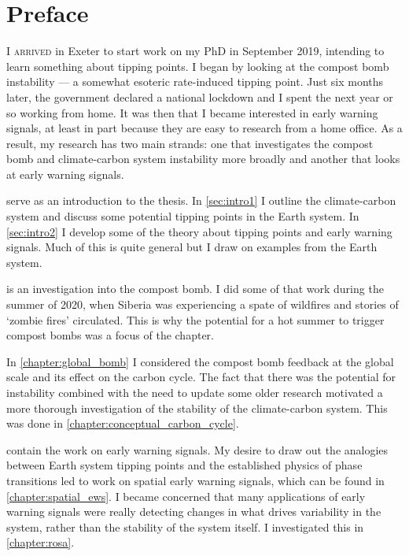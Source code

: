 \chapter{Preface}

\lettrine[lines=3,loversize=0.1,findent=0.1em,nindent=0em]{I}{ arrived} in Exeter to start work on my PhD in September 2019, intending to learn something about tipping points. I began by looking at the compost
bomb instability --- a somewhat esoteric rate-induced tipping point. Just six months later, the government declared a national lockdown
and I spent the next year or so working from home. It was then  that I became interested in early warning signals, at least in part because they are
easy to research from a home office. As a result, my research has two main strands: one that investigates the compost bomb and climate-carbon system instability more broadly
and another that looks at early warning signals.

 serve as an introduction to the thesis. In \cref{sec:intro1} I outline the climate-carbon system and discuss some potential
tipping points in the Earth system. In \cref{sec:intro2} I develop some of the theory about tipping points and early warning signals. Much of this is
quite general but I draw on examples from the Earth system.

 is an investigation into the compost bomb. I did some of that work during the summer of 2020, when Siberia
was experiencing a spate of wildfires and stories of `zombie fires' circulated. This is why the potential for a hot summer to trigger compost bombs
was a focus of the chapter.

In \cref{chapter:global_bomb} I considered the compost bomb feedback at the global scale and its effect on the carbon cycle.
The fact that there was the potential for instability combined with the need to update some older research motivated a more thorough investigation of
the stability of the climate-carbon system. This was done in \cref{chapter:conceptual_carbon_cycle}.

 contain the work on early warning signals. My desire to draw out the analogies between Earth system
tipping points and the established physics of phase transitions led to work on spatial early warning signals, which can be found in \cref{chapter:spatial_ews}.
I became concerned that many applications of early warning signals were really detecting changes in what drives variability in the system, rather than the stability
of the system itself. I investigated this in \cref{chapter:rosa}.

